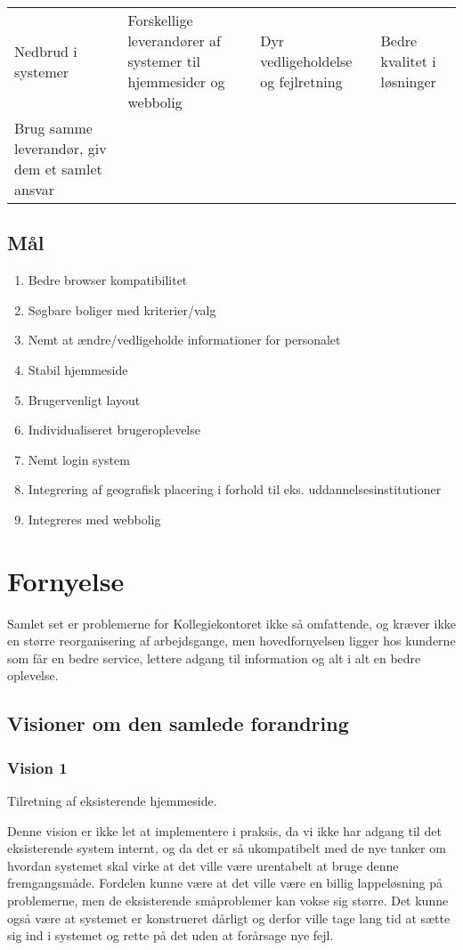 \documentclass[12pt, a4paper]{report}
\begin{document}
\begin{itemize}
\begin{tabular}{| l | l | l | l |}
Nedbrud i systemer & Forskellige leverandører af systemer til hjemmesider og webbolig & Dyr vedligeholdelse og fejlretning & Bedre kvalitet i løsninger \tabularnewline Brug samme leverandør, giv dem et samlet ansvar \\ \hline

\end{tabular}

\subsection{Mål}
\begin{enumerate}
\item Bedre browser kompatibilitet
\item Søgbare boliger med kriterier/valg
\item Nemt at ændre/vedligeholde informationer for personalet
\item Stabil hjemmeside
\item Brugervenligt layout
\item Individualiseret brugeroplevelse
\item Nemt login system
\item Integrering af geografisk placering i forhold til eks. uddannelsesinstitutioner
\item Integreres med webbolig
\end{enumerate}


\section{Fornyelse}
Samlet set er problemerne for Kollegiekontoret ikke så omfattende, og kræver ikke en større reorganisering af arbejdsgange, men hovedfornyelsen ligger hos kunderne som får en bedre service, lettere adgang til information og alt i alt en bedre oplevelse.

\subsection{Visioner om den samlede forandring}
\subsubsection{Vision 1}
Tilretning af eksisterende hjemmeside.

Denne vision er ikke let at implementere i praksis, da vi ikke har adgang til det eksisterende system internt, og da det er så ukompatibelt med de nye tanker om hvordan systemet skal virke at det ville være urentabelt at bruge denne fremgangsmåde. Fordelen kunne være at det ville være en billig lappeløsning på problemerne, men de eksisterende småproblemer kan vokse sig større. Det kunne også være at systemet er konstrueret dårligt og derfor ville tage lang tid at sætte sig ind i systemet og rette på det uden at forårsage nye fejl.


\end{itemize}
\end{document}
